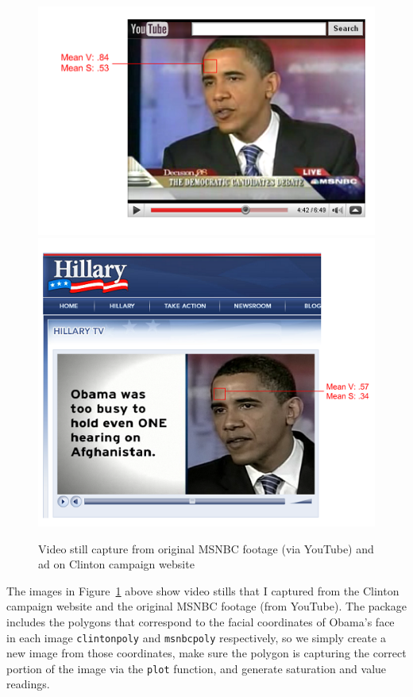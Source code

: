 \documentclass[12pt]{article}
\begin{document}
\begin{figure}[ht]
\centering
\caption{Video still capture from original MSNBC footage (via YouTube) and ad on Clinton campaign website}
\includegraphics{MSNBC.png}
\includegraphics{Clinton.png}
\label{fig:clintad}
\end{figure}

The images in Figure~\ref{fig:clintad} above show video stills that I captured from the Clinton campaign website and the original MSNBC footage (from YouTube).  The package includes the polygons that correspond to the facial coordinates of Obama's face in each image \texttt{clintonpoly} and \texttt{msnbcpoly} respectively, so we simply create a new image from those coordinates, make sure the polygon is capturing the correct portion of the image via the \texttt{plot} function, and generate saturation and value readings.       
\end{document}
